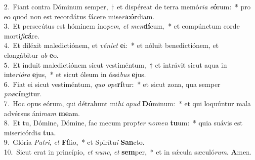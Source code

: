 {2.~}Fiant contra Dóminum semper,~† et dispéreat de terra memó\textit{ri}\textit{a} \textit{e}\textbf{ó}rum:~* pro eo quod non est recordátus fácere mise\textit{ri}\textbf{cór}diam.\\
{3.~}Et persecútus est hóminem íno\textit{pem}, \textit{et} \textit{men}\textbf{dí}cum,~* et compúnctum corde morti\textit{fi}\textbf{cá}re.\\
{4.~}Et diléxit maledictiónem, et \textit{vé}\textit{ni}\textit{et} \textbf{e}i:~* et nóluit benedictiónem, et elongábitur \textit{ab} \textbf{e}o.\\
{5.~}Et índuit maledictiónem sicut vestiméntum,~† et intrávit sicut aqua in inte\textit{ri}\textit{ó}\textit{ra} \textbf{e}jus,~* et sicut óleum in óssi\textit{bus} \textbf{e}jus.\\
{6.~}Fiat ei sicut vestiméntum, \textit{quo} \textit{o}\textit{pe}\textbf{rí}tur:~* et sicut zona, qua semper \textit{præ}\textbf{cín}gitur.\\
{7.~}Hoc opus eórum, qui détrahunt mi\textit{hi} \textit{a}\textit{pud} \textbf{Dó}minum:~* et qui loquúntur mala advérsus áni\textit{mam} \textbf{me}am.\\
{8.~}Et tu, Dómine, Dómine, fac mecum prop\textit{ter} \textit{no}\textit{men} \textbf{tu}um:~* quia suávis est misericórdi\textit{a} \textbf{tu}a.\\
{9.~}Glória \textit{Pa}\textit{tri}, \textit{et} \textbf{Fí}lio,~* et Spirítu\textit{i} \textbf{San}cto.\\
{10.~}Sicut erat in princípio, \textit{et} \textit{nunc}, \textit{et} \textbf{sem}per,~* et in sǽcula sæculó\textit{rum}. \textbf{A}men.\\
